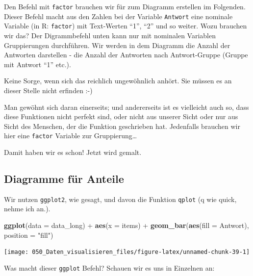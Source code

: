 \documentclass[12pt,]{book}
\makeatletter
\newenvironment{Shaded}{\begin{snugshade}}{\end{snugshade}}
\newcommand{\KeywordTok}[1]{\textcolor[rgb]{0.13,0.29,0.53}{\textbf{{#1}}}}
\newcommand{\DataTypeTok}[1]{\textcolor[rgb]{0.13,0.29,0.53}{{#1}}}
\newcommand{\StringTok}[1]{\textcolor[rgb]{0.31,0.60,0.02}{{#1}}}
\newcommand{\NormalTok}[1]{{#1}}
\newenvironment{kframe}{%
\medskip{}
\setlength{\fboxsep}{.8em}
 \def\at@end@of@kframe{}%
 \ifinner\ifhmode%
  \def\at@end@of@kframe{\end{minipage}}%
  \begin{minipage}{\columnwidth}%
 \fi\fi%
 \def\FrameCommand##1{\hskip\@totalleftmargin \hskip-\fboxsep
 \colorbox{shadecolor}{##1}\hskip-\fboxsep
     \hskip-\linewidth \hskip-\@totalleftmargin \hskip\columnwidth}%
 \MakeFramed {\advance\hsize-\width
   \@totalleftmargin\z@ \linewidth\hsize
   \@setminipage}}%
 {\par\unskip\endMakeFramed%
 \at@end@of@kframe}
\renewenvironment{Shaded}{\begin{kframe}}{\end{kframe}}
\makeatother
\begin{document}
Den Befehl mit \texttt{factor} brauchen wir für zum Diagramm erstellen
im Folgenden. Dieser Befehl macht aus den Zahlen bei der Variable
\texttt{Antwort} eine nominale Variable (in R: \texttt{factor}) mit
Text-Werten ``1'', ``2'' und so weiter. Wozu brauchen wir das? Der
Digrammbefehl unten kann nur mit nominalen Variablen Gruppierungen
durchführen. Wir werden in dem Diagramm die Anzahl der Antworten
darstellen - die Anzahl der Antworten nach Antwort-Gruppe (Gruppe mit
Antwort ``1'' etc.).

Keine Sorge, wenn sich das reichlich ungewöhnlich anhört. Sie müssen es
an dieser Stelle nicht erfinden :-)

Man gewöhnt sich daran einerseits; und andererseits ist es vielleicht
auch so, dass diese Funktionen nicht perfekt sind, oder nicht aus
unserer Sicht oder nur aus Sicht des Menschen, der die Funktion
geschrieben hat. Jedenfalls brauchen wir hier eine \texttt{factor}
Variable zur Gruppierung\ldots{}

Damit haben wir es schon! Jetzt wird gemalt.

\subsection{Diagramme für Anteile}\label{diagramme-fur-anteile}

Wir nutzen \texttt{ggplot2}, wie gesagt, und davon die Funktion
\texttt{qplot} (q wie quick, nehme ich an.).

\begin{Shaded}
\begin{Highlighting}[]
\KeywordTok{ggplot}\NormalTok{(}\DataTypeTok{data =} \NormalTok{data_long) +}
\StringTok{  }\KeywordTok{aes}\NormalTok{(}\DataTypeTok{x =} \NormalTok{items)  +}
\StringTok{  }\KeywordTok{geom_bar}\NormalTok{(}\KeywordTok{aes}\NormalTok{(}\DataTypeTok{fill =} \NormalTok{Antwort), }\DataTypeTok{position =} \StringTok{"fill"}\NormalTok{) }
\end{Highlighting}
\end{Shaded}

\begin{center}\texttt{[image: 050\_Daten\_visualisieren\_files/figure-latex/unnamed-chunk-39-1]} \end{center}

Was macht dieser \texttt{ggplot} Befehl? Schauen wir es uns in Einzelnen
an:
\end{document}
